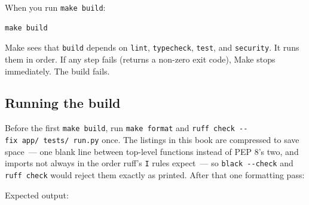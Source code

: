 \noindent{}When you run \texttt{make\ build}:

\begin{outputbox}[short]
\begin{Verbatim}[fontsize=\codesize, breaklines, breakanywhere, breaksymbolleft={\tiny\textcolor{muted}{$\hookrightarrow$}}]
make build
\end{Verbatim}
\end{outputbox}

\noindent{}Make sees that \texttt{build} depends on \texttt{lint}, \texttt{typecheck}, \texttt{test}, and \texttt{security}. It runs them in order. If any step fails (returns a non-zero exit code), Make stops immediately. The build fails.

\subsection*{Running the build}\label{17-build-process:running-the-build}

Before the first \texttt{make\ build}, run \texttt{make\ format} and \texttt{ruff\ check\ -}\allowbreak{}\texttt{-}\allowbreak{}\texttt{fix\ app/}\allowbreak{}\texttt{\ tests/}\allowbreak{}\texttt{\ run.}\allowbreak{}\texttt{py} once. The listings in this book are compressed to save space~--- one blank line between top-level functions instead of PEP 8's two, and imports not always in the order ruff's \texttt{I} rules expect~--- so \texttt{black\ -\/-check} and \texttt{ruff\ check} would reject them exactly as printed. After that one formatting pass:

\begin{codebox}[short]

\begin{Shaded}
\begin{Highlighting}[]
\end{Highlighting}
\end{Shaded}

\end{codebox}

\noindent{}Expected output:


